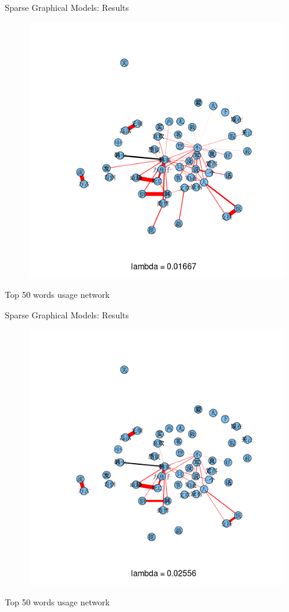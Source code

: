 \documentclass[12pt]{beamer}
\newcommand{\1}[1]{{\mathbf 1}\left\{#1\right\}}        %
\begin{document}
\begin{frame}{Sparse Graphical Models: Results}

\begin{figure}
  \centering
  \includegraphics[height=0.9\textheight]{./../../gLassoResults/glasso4.png} 
\end{figure}
\center Top 50 words usage network

\end{frame}
\begin{frame}{Sparse Graphical Models: Results}

\begin{figure}
  \centering
  \includegraphics[height=0.9\textheight]{./../../gLassoResults/glasso5.png} 
\end{figure}
\center Top 50 words usage network

\end{frame}
\end{document}

